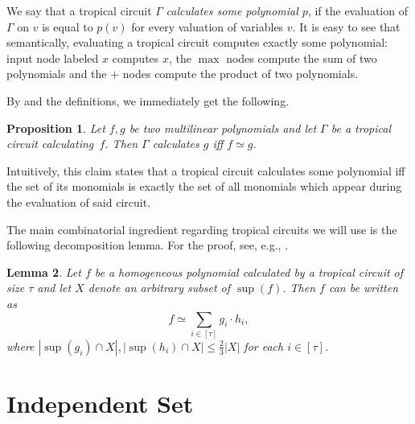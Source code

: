 \documentclass[11pt,a4paper]{article}
\newtheorem{lemma}{Lemma}[section]
\newtheorem{prop}[lemma]{Proposition}
\begin{document}
We say that a tropical circuit $\Gamma$ \emph{calculates some polynomial $p$}, if the evaluation of $\Gamma$ on $v$ is equal to $p(v)$ for every valuation of variables $v$. It is easy to see that semantically, evaluating a tropical circuit computes exactly some polynomial: input node labeled $x$ computes $x$, the $\max$ nodes compute the sum of two polynomials and the $+$ nodes compute the product of two polynomials.


By  and the definitions, we immediately get the following.

\begin{prop}\label{prop:tc_semantics}
    Let $f, g$ be two multilinear polynomials and let $\Gamma$ be a tropical circuit calculating~$f$. Then $\Gamma$ calculates $g$ iff $f \simeq g$.
\end{prop}
Intuitively, this claim states that a tropical circuit calculates some polynomial iff the set of its monomials is exactly the set of all monomials which appear during the evaluation of said circuit.

The main combinatorial ingredient regarding tropical circuits we will use is the following decomposition lemma. For the proof, see, e.g., \cite[Lemma 3.4]{Jukna2023}.
\begin{lemma}\label{lem:tc_decomposition}
    Let $f$ be a homogeneous polynomial calculated by a tropical circuit of size $\tau$ and let $X$ denote an arbitrary subset of $\sup(f)$. Then $f$ can be written as
    $$
        f \simeq \sum_{i \in [\tau]} g_i \cdot h_i,
    $$
    where $|\sup(g_i) \cap X|, |\sup(h_i) \cap X| \leq \frac{2}{3}|X|$ for each $i \in [\tau]$.
\end{lemma}






\section{Independent Set}
\label{sec:mwis}
\end{document}
